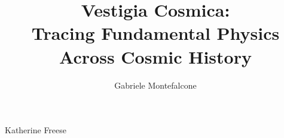 \author{Gabriele Montefalcone}  	%

\address{montefalcone@utexas.edu}  %

\title{Vestigia Cosmica: \\ Tracing Fundamental Physics \\
Across Cosmic History}
\supervisor
	{Katherine Freese}

%
%
%
%


